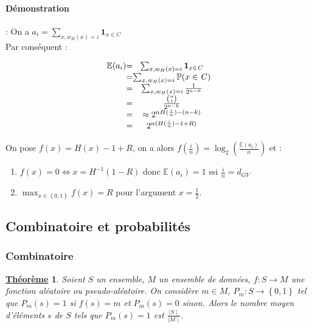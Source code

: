 \documentclass[12pt,openany]{report}
\newtheorem{theorem}{\underline{Théorème}}
\begin{document}
\paragraph{Démonstration}: On a $a_i=\sum_{x,w_H(x)=i}\mathbf{1}_{x\in \mathit{C}}$\\
Par conséquent :\\
\begin{center}
\[
\left.
\begin{array}{c @{=} c}

     \mathbb{E}(a_i) & \sum_{x,w_H(x)=i}\mathbf{1}_{x\in \mathit{C}}    \\
      &\sum_{x,w_H(x)=i}\mathbb{P}(x \in \mathit{C})   \\
      & \sum_{x,w_H(x)=i}\frac{1}{2^{n-k}} \\
      & \frac{{n\choose t}}{2^{n-k}}   \\
       & \approx 2^{nH(\frac{i}{n})-(n-k)} \\
   &   2^{n(H(\frac{i}{n})-1+R)} 
    
\end{array}
\right.
\]






\end{center}
On pose $f(x)=H(x)-1+R$, on a alors $f(\frac{i}{n})=\log_2\left(\frac{\mathbb{E}(a_i)}{n} \right)$ et :
\begin{enumerate}
\item $f(x)=0 \Leftrightarrow x= H^{-1}(1-R)$ donc $\mathbb{E}(a_i)=1$ ssi $\frac{i}{n}=d_{GV}$
\item $ \max_{x\in \left\lbrace 0,1 \right\rbrace } f(x)=R $ pour l'argument $x=\frac{1}{2} $.
\end{enumerate}

\subsection{Combinatoire et probabilités}
\subsubsection{Combinatoire}
\begin{theorem} Soient $\mathit{S}$ un ensemble, $\mathit{M}$ un ensemble de données, $f : \mathit{S} \rightarrow  \mathit{M}$
une fonction aléatoire ou pseudo-aléatoire. On considère $m \in M$, $P_m : \mathit{S}\rightarrow  \left\lbrace 0, 1\right\rbrace  $ tel que $P_m(s) = 1 $ si $f(s) = m$ et $P_m(s) = 0$ sinon. Alors le nombre moyen d’éléments $s$ de $\mathit{S}$ tels que $P_m(s) = 1$ est $\frac{\mid S \mid }{\mid M \mid}$.\cite{Ghazal}
\end{theorem}
\end{document}
